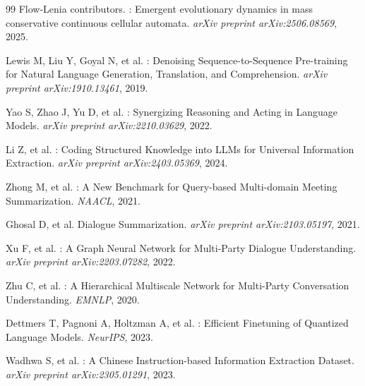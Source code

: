 \documentclass[12pt,a4paper]{ctexart}
\begin{document}
\begin{thebibliography}{99}
Flow-Lenia contributors.
: Emergent evolutionary dynamics in mass conservative continuous cellular automata.
\newblock \emph{arXiv preprint arXiv:2506.08569}, 2025.

Lewis M, Liu Y, Goyal N, et al.
: Denoising Sequence-to-Sequence Pre-training for Natural Language Generation, Translation, and Comprehension.
\newblock \emph{arXiv preprint arXiv:1910.13461}, 2019.

Yao S, Zhao J, Yu D, et al.
: Synergizing Reasoning and Acting in Language Models.
\newblock \emph{arXiv preprint arXiv:2210.03629}, 2022.

Li Z, et al.
: Coding Structured Knowledge into LLMs for Universal Information Extraction.
\newblock \emph{arXiv preprint arXiv:2403.05369}, 2024.

Zhong M, et al.
: A New Benchmark for Query-based Multi-domain Meeting Summarization.
\newblock \emph{NAACL}, 2021.

Ghosal D, et al.
\newblock Dialogue Summarization.
\newblock \emph{arXiv preprint arXiv:2103.05197}, 2021.

Xu F, et al.
: A Graph Neural Network for Multi-Party Dialogue Understanding.
\newblock \emph{arXiv preprint arXiv:2203.07282}, 2022.

Zhu C, et al.
: A Hierarchical Multiscale Network for Multi-Party Conversation Understanding.
\newblock \emph{EMNLP}, 2020.

Dettmers T, Pagnoni A, Holtzman A, et al.
: Efficient Finetuning of Quantized Language Models.
\newblock \emph{NeurIPS}, 2023.

Wadhwa S, et al.
: A Chinese Instruction-based Information Extraction Dataset.
\newblock \emph{arXiv preprint arXiv:2305.01291}, 2023.

\end{thebibliography}
\end{document}
